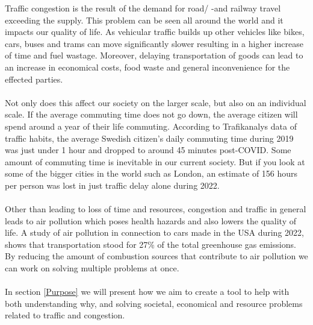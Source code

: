 
Traffic congestion is the result of the demand for road/ -and railway travel exceeding the supply. This problem can be seen all around the world\cite{inrix} and it impacts our quality of life. As vehicular traffic builds up other vehicles like bikes, cars, buses and trams can move significantly slower resulting in a higher increase of time and fuel wastage. Moreover, delaying transportation of goods can lead to an increase in economical costs, food waste and general inconvenience for the effected parties.
\\\\
Not only does this affect our society on the larger scale, but also on an individual scale. If the average commuting time does not go down, the average citizen will spend around a year of their life commuting. According to Trafikanalys data of traffic habits\cite{trafikanalys_2022}, the average Swedish citizen's daily commuting time during 2019 was just under 1 hour and dropped to around 45 minutes post-COVID. Some amount of commuting time is inevitable in our current society. But if you look at some of the bigger cities in the world such as London, an estimate of 156 hours per person was lost in just traffic delay alone during 2022\cite{inrix}.
\\\\
Other than leading to loss of time and resources, congestion and traffic in general leads to air pollution which poses health hazards and also lowers the quality of life\cite{urban_2004}. A study of air pollution in connection to cars made in the USA during 2022, shows that transportation stood for 27\% of the total greenhouse gas emissions\cite{treehugger_2022}. By reducing the amount of combustion sources that contribute to air pollution we can work on solving multiple problems at once.
\\\\
In section \ref{Purpose} we will present how we aim to create a tool to help with both understanding why, and solving societal, economical and resource problems related to traffic and congestion.